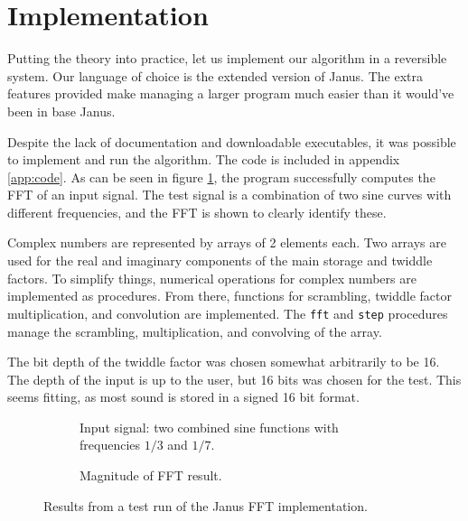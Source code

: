 \section{Implementation}
Putting the theory into practice,
let us implement our algorithm in a reversible system.
Our language of choice is the extended version\cite{extjanus} of Janus\cite{janus2007}.
The extra features provided make managing a larger program much easier
than it would've been in base Janus.

Despite the lack of documentation and downloadable executables,
it was possible to implement and run the algorithm.
The code is included in appendix \ref{app:code}.
As can be seen in figure \ref{fig:test},
the program successfully computes the FFT of an input signal.
The test signal is a combination of two sine curves with different frequencies,
and the FFT is shown to clearly identify these.

Complex numbers are represented by arrays of 2 elements each.
Two arrays are used for the real and imaginary components of the main storage and twiddle factors.
To simplify things, numerical operations for complex numbers are implemented as procedures.
From there, functions for scrambling,
twiddle factor multiplication, and convolution are implemented.
The \texttt{fft} and \texttt{step} procedures manage the scrambling, multiplication, and convolving
of the array.

The bit depth of the twiddle factor was chosen somewhat arbitrarily to be 16.
The depth of the input is up to the user,
but 16 bits was chosen for the test.
This seems fitting, as most sound is stored in a signed 16 bit format.

\begin{figure}
    \centering
    \begin{subfigure}[b]{0.8\textwidth}
        \resizebox{\textwidth}{!}{}
        \caption{Input signal: two combined sine functions with frequencies $1/3$ and $1/7$.}
    \end{subfigure}
    \begin{subfigure}[b]{0.8\textwidth}
        \resizebox{\textwidth}{!}{}
        \caption{Magnitude of FFT result.}
    \end{subfigure}
    \caption{Results from a test run of the Janus FFT implementation.\label{fig:test}}
\end{figure}
